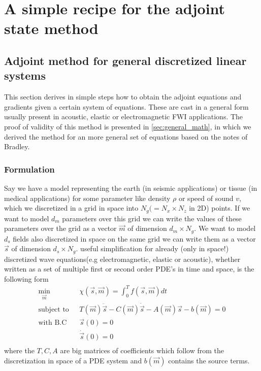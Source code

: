 \documentclass[fleqn,11pt]{SelfArx} %
\theoremstyle{definition}
\begin{document}


\section{A simple recipe for the adjoint state method}


\subsection{Adjoint method for general discretized linear systems}\label{sec:discretized_math}
This section derives in simple steps how to obtain the adjoint equations and gradients given a certain system of equations. These are cast in a general form usually present in acoustic, elastic or electromagnetic FWI applications. The proof of validity of this method is presented in \cref{sec:general_math}, in which we derived the method for an more general set of equations based on the notes of Bradley\cite{Bradley2012}.
\subsubsection{Formulation}{}
Say we have a model representing the earth (in seismic applications) or tissue (in medical applications) for some parameter like density $\rho$ or speed of sound $v$, which we discretized in a grid in space into $N_g  (= N_x \times N_z$ in 2D) points. If we want to model $d_m$ parameters over this grid we can write the values of these parameters over the grid as a vector $\vec{m}$ of dimension $d_m \times N_g$. We want to model $d_s$ fields also discretized in space on the same grid we can write them as a vector $\vec{s}$ of dimension $d_s \times N_g$. 
useful simplification for already (only in space!) discretized wave equations(e.g electromagnetic, elastic or acoustic), whether written as a set of multiple first or second order PDE's in time and space, is the following form
\begin{equation}
\label{eq:discretised_linear_system}
\begin{aligned}
\underset{\vec{m}}{\text{min}}\  & \chi\left(\vec{s},\vec{m}\right) =   \int_0^T f\left(\vec{s},\vec{m}\right) dt \\
\text{subject to}\ \ \   &   T\left(\vec{m}\right)\ddot{\vec{s}} - C\left(\vec{m}\right)\dot{\vec{s}} - A\left(\vec{m}\right)\vec{s} -b\left(\vec{m}\right)= 0 \\
 \text{with B.C}\ \ \  &  \vec{s}\left(0\right)  = 0 \\
 &  \dot{\vec{s}}\left(0\right)  = 0 \\
\end{aligned}
\end{equation}
where the $T, C, A$ are big matrices of coefficients which follow from the discretization in space of a PDE system and $b\left(\vec{m}\right)$ contains the source terms. 
\end{document}
